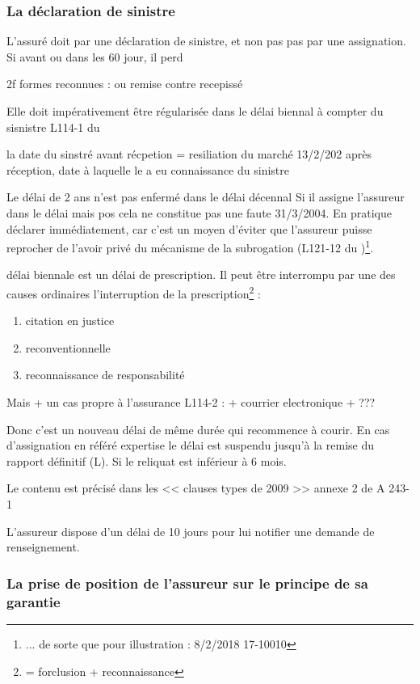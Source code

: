 		\subsubsection{La déclaration de sinistre}

			L'assuré doit par une déclaration de sinistre, et non pas pas par une assignation. Si avant ou dans les 60 jour, il perd

			2f formes reconnues : \lrar ou remise contre recepissé

			Elle doit impérativement être régularisée dans le délai biennal à compter du sisnistre L114-1 du \ca

			la date du sinstré avant récpetion = resiliation du marché 13/2/202
			après réception, date à laquelle le \Mo a eu connaissance du sinistre

			Le délai de 2 ans n'est pas enfermé dans le délai décennal Si il assigne l'assureur dans le délai mais pos cela ne constitue pas une faute 31/3/2004. En pratique déclarer immédiatement, car c'est un moyen d'éviter que l'assureur puisse reprocher de l'avoir privé du mécanisme de la subrogation (L121-12 du \ca)\footnote{... de sorte que pour illustration :  8/2/2018 17-10010}.

			délai biennale est un délai de prescription. Il peut être interrompu par une des causes ordinaires l'interruption de la prescription\footnote{= forclusion + reconnaissance} :
			\begin{enumerate}
				\item citation en justice
				\item reconventionnelle
				\item reconnaissance de responsabilité
			\end{enumerate}
			Mais
			+ un cas propre à l'assurance L114-2 : \lrar
			+ courrier electronique
			+ ???

			Donc c'est un nouveau délai de même durée qui recommence à courir. En cas d'assignation en référé expertise le délai est suspendu jusqu'à la remise du rapport définitif (L). Si le reliquat est inférieur à 6 mois.

			Le contenu est précisé dans les << clauses types de 2009 >> annexe 2 de A 243-1

			L'assureur dispose d'un délai de 10 jours pour lui notifier une demande de renseignement.

		\subsubsection{La prise de position de l'assureur sur le principe de sa garantie}

